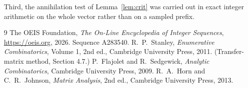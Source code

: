 \documentclass[11pt,a4paper]{article}
\theoremstyle{plain}
\theoremstyle{definition}
\begin{document}
Third, the annihilation test of Lemma~\ref{lem:crit} was carried out in exact integer
arithmetic on the whole vector rather than on a sampled prefix.

\begin{thebibliography}{9}
 The OEIS Foundation, \emph{The On-Line Encyclopedia of Integer
Sequences}, \url{https://oeis.org}, 2026. Sequence A283540.
 R.~P.~Stanley, \emph{Enumerative Combinatorics}, Volume 1, 2nd ed.,
Cambridge University Press, 2011. (Transfer-matrix method, Section 4.7.)
 P.~Flajolet and R.~Sedgewick, \emph{Analytic Combinatorics}, Cambridge
University Press, 2009.
 R.~A.~Horn and C.~R.~Johnson, \emph{Matrix Analysis}, 2nd ed., Cambridge
University Press, 2013.
\end{thebibliography}
\end{document}
